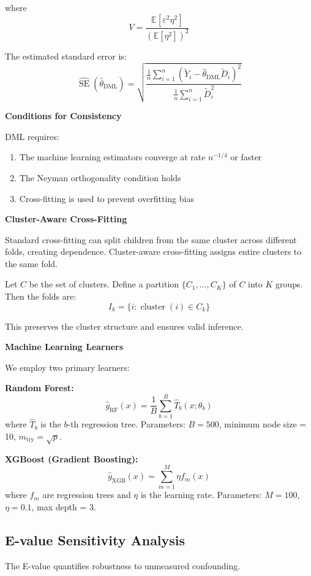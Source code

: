 where
\[
V = \frac{\mathbb{E}[\varepsilon^2 \eta^2]}{(\mathbb{E}[\eta^2])^2}
\]

The estimated standard error is:
\[
\widehat{\operatorname{SE}}(\hat{\theta}_{\text{DML}}) = \sqrt{\frac{\frac{1}{n}\sum_{i=1}^n (\tilde{Y}_i - \hat{\theta}_{\text{DML}} \tilde{D}_i)^2}{\frac{1}{n}\sum_{i=1}^n \tilde{D}_i^2}}
\]

\textbf{Conditions for Consistency}

DML requires:
\begin{enumerate}
	\item The machine learning estimators converge at rate $n^{-1/4}$ or faster
	\item The Neyman orthogonality condition holds
	\item Cross-fitting is used to prevent overfitting bias
\end{enumerate}

\textbf{Cluster-Aware Cross-Fitting}

Standard cross-fitting can split children from the same cluster across different folds, creating dependence. Cluster-aware cross-fitting assigns entire clusters to the same fold.

Let $C$ be the set of clusters. Define a partition $\{C_1, \ldots, C_K\}$ of $C$ into $K$ groups. Then the folds are:
\[
I_k = \{i: \operatorname{cluster}(i) \in C_k\}
\]

This preserves the cluster structure and ensures valid inference.

\textbf{Machine Learning Learners}

We employ two primary learners:

\textbf{Random Forest:}
\[
\hat{g}_{\text{RF}}(x) = \frac{1}{B} \sum_{b=1}^B \hat{T}_b(x; \theta_b)
\]
where $\hat{T}_b$ is the $b$-th regression tree. Parameters: $B = 500$, minimum node size = 10, $m_{\text{try}} = \sqrt{p}$.

\textbf{XGBoost (Gradient Boosting):}
\[
\hat{g}_{\text{XGB}}(x) = \sum_{m=1}^M \eta f_m(x)
\]
where $f_m$ are regression trees and $\eta$ is the learning rate. Parameters: $M = 100$, $\eta = 0.1$, max depth = 3.

\subsection{E-value Sensitivity Analysis}

The E-value \citep{vanderweele2017sensitivity, chung2023evalue} quantifies robustness to unmeasured confounding.

